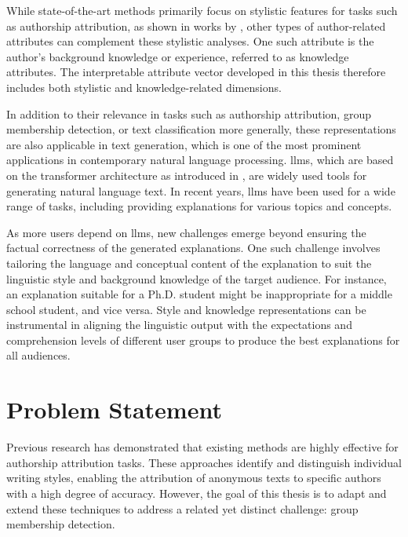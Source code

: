 While state-of-the-art methods primarily focus on stylistic features for tasks such as authorship attribution, as shown in works by \citet{alshomaryLatentSpaceInterpretation2024, patelLearningInterpretableStyle2023, konenStyleVectorsSteering2024, zhu-etal-2024-styleflow}, other types of author-related attributes can complement these stylistic analyses. One such attribute is the author's background knowledge or experience, referred to as knowledge attributes. %
The interpretable attribute vector developed in this thesis therefore includes both stylistic and knowledge-related dimensions.

In addition to their relevance in tasks such as authorship attribution, group membership detection, or text classification more generally, these representations are also applicable in text generation, which is one of the most prominent applications in contemporary natural language processing. \Acp{llm}, which are based on the transformer architecture as introduced in \citet{NIPS2017_3f5ee243}, are widely used tools for generating natural language text. In recent years, \acp{llm} have been used for a wide range of tasks, including providing explanations for various topics and concepts.

As more users depend on \acp{llm}, new challenges emerge beyond ensuring the factual correctness of the generated explanations. One such challenge involves tailoring the language and conceptual content of the explanation to suit the linguistic style and background knowledge of the target audience. For instance, an explanation suitable for a Ph.D. student might be inappropriate for a middle school student, and vice versa. Style and knowledge representations can be instrumental in aligning the linguistic output with the expectations and comprehension levels of different user groups to produce the best explanations for all audiences.


\section{Problem Statement}
\label{sec:introduction:problemStatement}
Previous research has demonstrated that existing methods are highly effective for authorship attribution tasks. These approaches identify and distinguish individual writing styles, enabling the attribution of anonymous texts to specific authors with a high degree of accuracy. However, the goal of this thesis is to adapt and extend these techniques to address a related yet distinct challenge: group membership detection.

